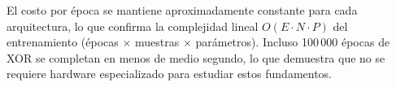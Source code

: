 El costo por época se mantiene aproximadamente constante para cada arquitectura, lo que confirma la complejidad lineal $O(E\cdot N\cdot P)$ del entrenamiento (épocas $\times$ muestras $\times$ parámetros). Incluso 100\,000 épocas de XOR se completan en menos de medio segundo, lo que demuestra que no se requiere hardware especializado para estudiar estos fundamentos.
